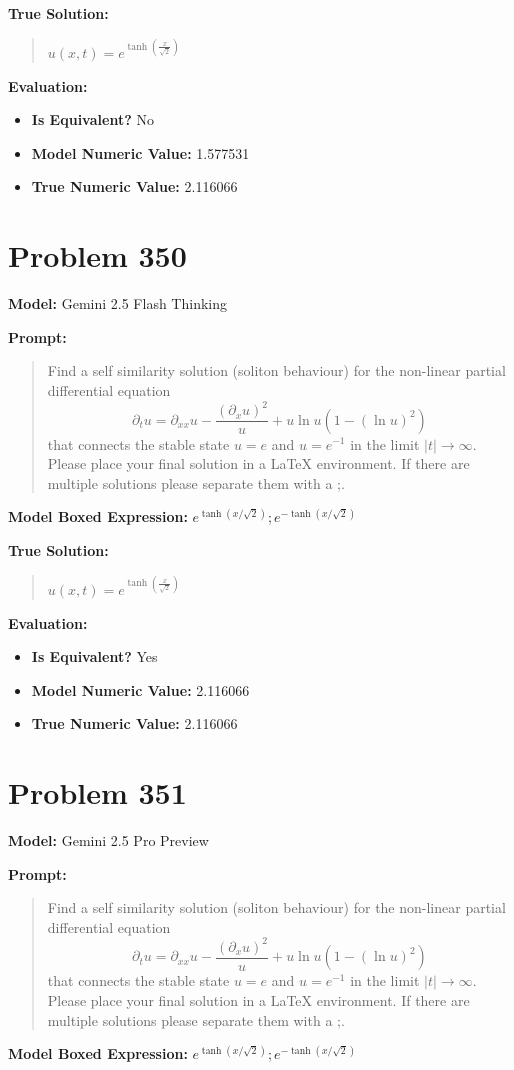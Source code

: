 \documentclass{article}
\begin{document}
{\textbf{True Solution:}
\begin{quote}
$u(x,t) = e^{\tanh\left(\frac{x}{\sqrt{2}}\right)}$
\end{quote}

\textbf{Evaluation:}
\begin{itemize}
\item \textbf{Is Equivalent?} No
\item \textbf{Model Numeric Value:} 1.577531
\item \textbf{True Numeric Value:} 2.116066
\end{itemize}
\vspace{1cm}
\section*{Problem 350}
\textbf{Model:} Gemini 2.5 Flash Thinking

\textbf{Prompt:}
\begin{quote}
Find a self similarity solution (soliton behaviour) for the non-linear partial differential equation $$ \partial_t u = \partial_{xx} u - \frac{(\partial_x u)^2}{u} + u \ln u \left(1 - (\ln u)^2\right) $$ that connects the stable state $u = e$ and $u = e^{-1}$ in the limit $|t| \rightarrow \infty$. Please place your final solution in a \boxed{} LaTeX environment. If there are multiple solutions please separate them with a ;.
\end{quote}
\textbf{Model Boxed Expression:} $e^{\tanh(x/\sqrt{2})}; e^{-\tanh(x/\sqrt{2})}$

\textbf{True Solution:}
\begin{quote}
$u(x,t) = e^{\tanh\left(\frac{x}{\sqrt{2}}\right)}$
\end{quote}

\textbf{Evaluation:}
\begin{itemize}
\item \textbf{Is Equivalent?} Yes
\item \textbf{Model Numeric Value:} 2.116066
\item \textbf{True Numeric Value:} 2.116066
\end{itemize}
\vspace{1cm}
\section*{Problem 351}
\textbf{Model:} Gemini 2.5 Pro Preview

\textbf{Prompt:}
\begin{quote}
Find a self similarity solution (soliton behaviour) for the non-linear partial differential equation $$ \partial_t u = \partial_{xx} u - \frac{(\partial_x u)^2}{u} + u \ln u \left(1 - (\ln u)^2\right) $$ that connects the stable state $u = e$ and $u = e^{-1}$ in the limit $|t| \rightarrow \infty$. Please place your final solution in a \boxed{} LaTeX environment. If there are multiple solutions please separate them with a ;.
\end{quote}
\textbf{Model Boxed Expression:} $e^{\tanh(x/\sqrt{2})}; e^{-\tanh(x/\sqrt{2})}$

}
\end{document}

